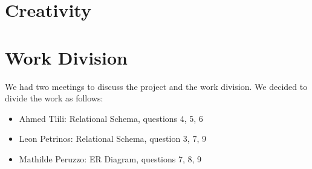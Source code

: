 \documentclass[a4paper,11pt]{article}
\begin{document}
\section{Creativity}

\section{Work Division}
We had two meetings to discuss the project and the work division. We decided to divide the work as follows:
\begin{itemize}
    \item Ahmed Tlili: Relational Schema, questions 4, 5, 6
    \item Leon Petrinos: Relational Schema, question 3, 7, 9
    \item Mathilde Peruzzo: ER Diagram, questions 7, 8, 9
\end{itemize}
\end{document}
